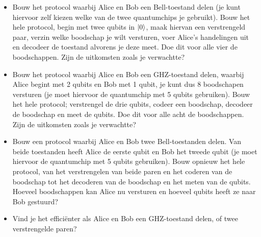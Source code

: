 \documentclass[10pt, a4paper]{article}
\begin{document}
\begin{itemize}
\item Bouw het protocol waarbij Alice en Bob een Bell-toestand delen (je kunt hiervoor zelf kiezen welke van de twee quantumchips je gebruikt). Bouw het hele protocol, begin met twee qubits in $\ket{0}$, maak hiervan een verstrengeld paar, verzin welke boodschap je wilt versturen, voer Alice's handelingen uit en decodeer de toestand alvorens je deze meet. Doe dit voor alle vier de boodschappen. Zijn de uitkomsten zoals je verwachtte?

\item Bouw het protocol waarbij Alice en Bob een GHZ-toestand delen, waarbij Alice begint met 2 qubits en Bob met 1 qubit, je kunt dus 8 boodschapen versturen (je moet hiervoor de quantumchip met 5 qubits gebruiken). Bouw het hele protocol; verstrengel de drie qubits, codeer een boodschap, decodeer de boodschap en meet de qubits. Doe dit voor alle acht de boodschappen. Zijn de uitkomsten zoals je verwachtte?

\item Bouw een protocol waarbij Alice en Bob twee Bell-toestanden delen. Van beide toestanden heeft Alice de eerste qubit en Bob het tweede qubit (je moet hiervoor de quantumchip met 5 qubits gebruiken). Bouw opnieuw het hele protocol, van het verstrengelen van beide paren en het coderen van de boodschap tot het decoderen van de boodschap en het meten van de qubits. Hoeveel boodschappen kan Alice nu versturen en hoeveel qubits heeft ze naar Bob gestuurd?

\item Vind je het effici\"{e}nter als Alice en Bob een GHZ-toestand delen, of twee verstrengelde paren?
\end{itemize}



\clearpage
\end{document}
